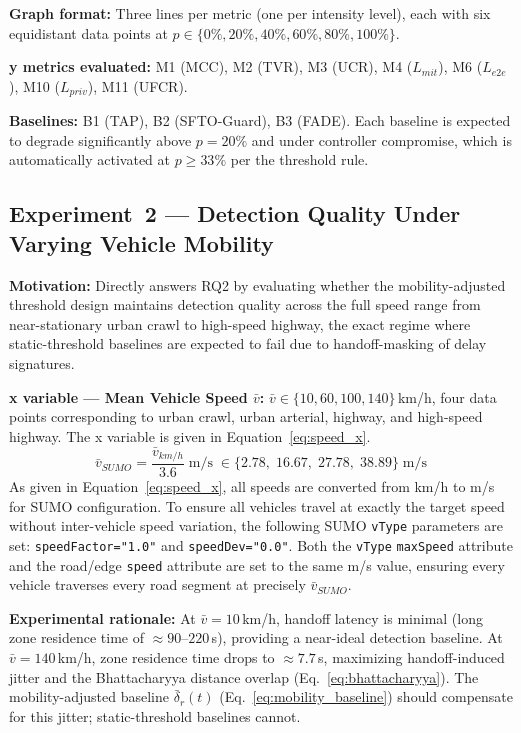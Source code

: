 \documentclass[12pt, a4paper]{report}
\begin{document}
{{\textbf{Graph format:} Three lines per metric (one
per intensity level), each with six equidistant
data points at $p \in \{0\%, 20\%, 40\%, 60\%,
80\%, 100\%\}$.

\textbf{y metrics evaluated:}
M1 (MCC), M2 (TVR), M3 (UCR), M4 ($L_{mit}$),
M6 ($L_{e2e}$), M10 ($L_{priv}$), M11 (UFCR).

\textbf{Baselines:} B1 (TAP), B2 (SFTO-Guard),
B3 (FADE). Each baseline is expected to degrade
significantly above $p = 20\%$ and under controller
compromise, which is automatically activated at
$p \geq 33\%$ per the threshold rule.



\subsection{Experiment~2 — Detection Quality Under
Varying Vehicle Mobility}
\label{sec:exp2}

\textbf{Motivation:} Directly answers RQ2 by
evaluating whether the mobility-adjusted threshold
design maintains detection quality across the full
speed range from near-stationary urban crawl to
high-speed highway, the exact regime where
static-threshold baselines are expected to fail
due to handoff-masking of delay signatures.

\textbf{x variable — Mean Vehicle Speed $\bar{v}$:}
$\bar{v} \in \{10, 60, 100, 140\}$\,km/h,
four data points corresponding to urban crawl,
urban arterial, highway, and high-speed highway.
The x variable is given in
Equation~\eqref{eq:speed_x}.
\begin{equation}
\bar{v}_{SUMO} = \frac{\bar{v}_{km/h}}{3.6}
\;\text{m/s} \;\in
\{2.78,\; 16.67,\; 27.78,\; 38.89\}\;\text{m/s}
\label{eq:speed_x}
\end{equation}
As given in Equation~\eqref{eq:speed_x}, all speeds
are converted from km/h to m/s for \ac{SUMO}
configuration. To ensure all vehicles travel at
exactly the target speed without inter-vehicle speed
variation, the following \ac{SUMO} \texttt{vType}
parameters are set: \texttt{speedFactor="1.0"} and
\texttt{speedDev="0.0"}. Both the \texttt{vType}
\texttt{maxSpeed} attribute and the road/edge
\texttt{speed} attribute are set to the same m/s
value, ensuring every vehicle traverses every road
segment at precisely $\bar{v}_{SUMO}$.

\textbf{Experimental rationale:} At $\bar{v} = 10$\,km/h,
handoff latency is minimal (long zone residence time
of $\approx 90$--$220$\,s), providing a near-ideal
detection baseline. At $\bar{v} = 140$\,km/h,
zone residence time drops to $\approx 7.7$\,s,
maximizing handoff-induced jitter and the
Bhattacharyya distance overlap
(Eq.~\ref{eq:bhattacharyya}). The mobility-adjusted
baseline $\bar{\delta}_r(t)$ (Eq.~\ref{eq:mobility_baseline})
should compensate for this jitter; static-threshold
baselines cannot.

}}
\end{document}

